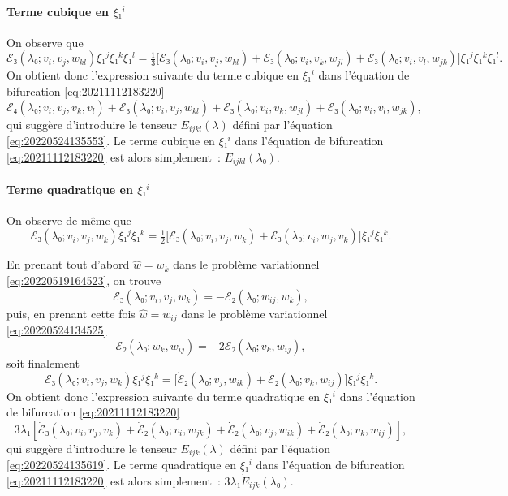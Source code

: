 \documentclass[12pt, final]{amsart}
\theoremstyle{definition}
\begin{document}
\paragraph{Terme cubique en \(ξ₁^i\)} On observe que
\begin{equation}
  ℰ₃(λ₀; v_i, v_j, w_{k l}) ξ₁^j ξ₁^k ξ₁^l = \tfrac{1}{3} \bigl[ℰ₃(λ₀; v_i, v_j, w_{k l}) + ℰ₃(λ₀; v_i, v_k, w_{j l}) + ℰ₃(λ₀; v_i, v_l, w_{j k})\bigr] ξ₁^j ξ₁^k ξ₁^l.
\end{equation}
On obtient donc l'expression suivante du terme cubique en \(ξ₁^i\) dans
l'équation de bifurcation \eqref{eq:20211112183220}
\begin{equation}
  ℰ₄(λ₀; v_i, v_j, v_k, v_l) + ℰ₃(λ₀ ; v_i, v_j, w_{k l}) + ℰ₃(λ₀; v_i, v_k, w_{j l}) + ℰ₃(λ₀; v_i, v_l, w_{j k}),
\end{equation}
qui suggère d'introduire le tenseur \(E_{ijkl}(λ)\) défini par l'équation
\eqref{eq:20220524135553}. Le terme cubique en \(ξ₁^i\) dans l'équation de
bifurcation \eqref{eq:20211112183220} est alors simplement~: \(E_{ijkl}(λ₀)\).

\paragraph{Terme quadratique en \(ξ₁^i\)} On observe de même que
\begin{equation}
  ℰ₃(λ₀; v_i, v_j, w_k) ξ₁^j ξ₁^k = \tfrac{1}{2} \bigl[ℰ₃(λ₀; v_i, v_j, w_k) + ℰ₃(λ₀; v_i, w_j, v_k)\bigr] ξ₁^j ξ₁^k.
\end{equation}

En prenant tout d'abord \(\hat{w} = w_k\) dans le problème variationnel
\eqref{eq:20220519164523}, on trouve
\begin{equation}
  ℰ₃(λ₀; v_i, v_j, w_k) = -ℰ₂(λ₀ ; w_{i j}, w_k),
\end{equation}
puis, en prenant cette fois \(\hat{w} = w_{i j}\) dans le problème variationnel
\eqref{eq:20220524134525}
\begin{equation}
  ℰ₂(λ₀; w_k, w_{i j}) = - 2 \dot{ℰ}₂(λ₀; v_k, w_{i j}),
\end{equation}
soit finalement
\begin{equation}
  ℰ₃(λ₀; v_i, v_j, w_k) ξ₁^j ξ₁^k = \bigl[\dot{ℰ}₂(λ₀; v_j, w_{i k}) + \dot{ℰ}₂(λ₀; v_k, w_{i j})\bigr] ξ₁^j ξ₁^k.
\end{equation}
On obtient donc l'expression suivante du terme quadratique en \(ξ₁^i\) dans
l'équation de bifurcation \eqref{eq:20211112183220}
\begin{equation}
  3 λ₁ [\dot{ℰ}₃(λ₀; v_i, v_j, v_k) + \dot{ℰ}₂(λ₀; v_i, w_{j k}) + \dot{ℰ}₂(λ₀; v_j, w_{i k}) + \dot{ℰ}₂(λ₀; v_k, w_{i j})],
\end{equation}
qui suggère d'introduire le tenseur \(E_{ijk}(λ)\) défini par l'équation
\eqref{eq:20220524135619}. Le terme quadratique en \(ξ₁^i\) dans l'équation de
bifurcation \eqref{eq:20211112183220} est alors simplement~:
\(3 λ₁ \dot{E}_{ijk}(λ₀)\).
\end{document}

